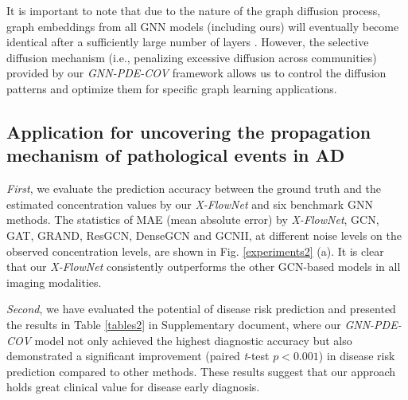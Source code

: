 \documentclass{article}
\begin{document}
It is important to note that due to the nature of the graph diffusion process, graph embeddings from all GNN models (including ours) will eventually become identical after a sufficiently large number of layers \cite{coifman2006diffusion}. However, the selective diffusion mechanism (i.e., penalizing excessive diffusion across communities) provided by our \textit{GNN-PDE-COV} framework allows us to control the diffusion patterns and optimize them for specific graph learning applications.


\subsection{Application for uncovering the propagation mechanism of pathological events in AD}
\label{exp2}
\textit{First}, we evaluate the prediction accuracy between the ground truth and the estimated concentration values by our \textit{X-FlowNet} and six benchmark GNN methods.
The statistics of MAE (mean absolute error) by \textit{X-FlowNet}, GCN, GAT, GRAND, ResGCN, DenseGCN and GCNII, at different noise levels on the observed concentration levels, are shown in Fig. \ref{experiments2} (a). It is clear that our \textit{X-FlowNet} consistently outperforms the other GCN-based models in all imaging modalities.

\textit{Second}, we have evaluated the potential of disease risk prediction and presented the results in Table \ref{tables2} in Supplementary document, where our \textit{GNN-PDE-COV} model not only achieved the highest diagnostic accuracy but also demonstrated a significant improvement (paired \textit{t}-test $p<0.001$) in disease risk prediction compared to other methods. These results suggest that our approach holds great clinical value for disease early diagnosis.
\end{document}
